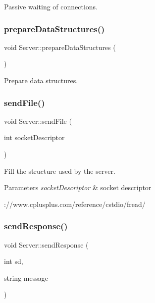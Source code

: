 Passive waiting of connections. \mbox{\label{classServer_a5a4cae5c2975f4f9a655b766f10628dd}} 
\subsubsection{\texorpdfstring{prepare\+Data\+Structures()}{prepareDataStructures()}}
{\footnotesize\ttfamily void Server\+::prepare\+Data\+Structures (\begin{DoxyParamCaption}{ }\end{DoxyParamCaption})\hspace{0.3cm}{\ttfamily [private]}}

Prepare data structures. \mbox{\label{classServer_af8e4dc8d1a4eff9b99165513e5123d8a}} 
\subsubsection{\texorpdfstring{send\+File()}{sendFile()}}
{\footnotesize\ttfamily void Server\+::send\+File (\begin{DoxyParamCaption}\item[{int}]{socket\+Descriptor }\end{DoxyParamCaption})\hspace{0.3cm}{\ttfamily [private]}}

Fill the structure used by the server. 
\begin{DoxyParams}{Parameters}
{\em socket\+Descriptor} & socket descriptor\\
\hline
\end{DoxyParams}
\+://www.cplusplus.\+com/reference/cstdio/fread/ \mbox{\label{classServer_a925825ad85f2ee6695d46d479e1a9511}} 
\subsubsection{\texorpdfstring{send\+Response()}{sendResponse()}}
{\footnotesize\ttfamily void Server\+::send\+Response (\begin{DoxyParamCaption}\item[{int}]{sd,  }\item[{string}]{message }\end{DoxyParamCaption})\hspace{0.3cm}{\ttfamily [private]}}

